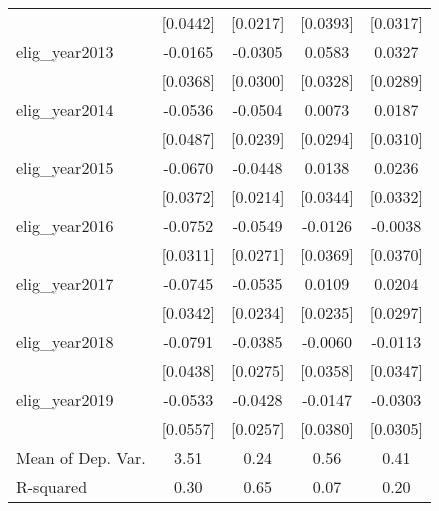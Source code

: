 \begin{table}[htbp]
\begin{tabular}{l*{4}{c}}
                    &    [0.0442]         &    [0.0217]         &    [0.0393]         &    [0.0317]         \\
\addlinespace
elig\_year2013       &     -0.0165         &     -0.0305         &      0.0583\sym{*}  &      0.0327         \\
                    &    [0.0368]         &    [0.0300]         &    [0.0328]         &    [0.0289]         \\
\addlinespace
elig\_year2014       &     -0.0536         &     -0.0504\sym{**} &      0.0073         &      0.0187         \\
                    &    [0.0487]         &    [0.0239]         &    [0.0294]         &    [0.0310]         \\
\addlinespace
elig\_year2015       &     -0.0670\sym{*}  &     -0.0448\sym{**} &      0.0138         &      0.0236         \\
                    &    [0.0372]         &    [0.0214]         &    [0.0344]         &    [0.0332]         \\
\addlinespace
elig\_year2016       &     -0.0752\sym{**} &     -0.0549\sym{**} &     -0.0126         &     -0.0038         \\
                    &    [0.0311]         &    [0.0271]         &    [0.0369]         &    [0.0370]         \\
\addlinespace
elig\_year2017       &     -0.0745\sym{**} &     -0.0535\sym{**} &      0.0109         &      0.0204         \\
                    &    [0.0342]         &    [0.0234]         &    [0.0235]         &    [0.0297]         \\
\addlinespace
elig\_year2018       &     -0.0791\sym{*}  &     -0.0385         &     -0.0060         &     -0.0113         \\
                    &    [0.0438]         &    [0.0275]         &    [0.0358]         &    [0.0347]         \\
\addlinespace
elig\_year2019       &     -0.0533         &     -0.0428         &     -0.0147         &     -0.0303         \\
                    &    [0.0557]         &    [0.0257]         &    [0.0380]         &    [0.0305]         \\
\midrule
Mean of Dep. Var.   &        3.51         &        0.24         &        0.56         &        0.41         \\
R-squared           &        0.30         &        0.65         &        0.07         &        0.20         \\

\end{tabular}
\end{table}
